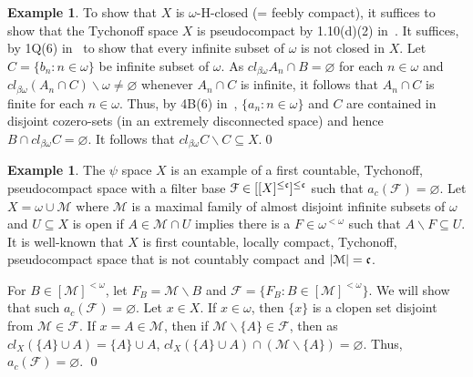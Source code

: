 \documentclass[11pt]{amsart}
\theoremstyle{definition}
\newtheorem{example}[theorem]{Example}
\theoremstyle{remark}
\numberwithin{equation}{section}
\begin{document}
\begin{example}
To show that $X$ is $\omega$-H-closed (= feebly compact), it suffices to show that the Tychonoff space $X$ is pseudocompact by 1.10(d)(2) in~\cite{PW}. It suffices, by 1Q(6) in~\cite{PW} to show that every infinite subset of $\omega$ is not closed in $X$.  Let $C = \{b_n:n \in \omega\}$ be infinite subset of $\omega$.  As $cl_{\beta\omega}A_n \cap B = \varnothing$ for each $n \in \omega$ and $cl_{\beta\omega}(A_n \cap C)\backslash \omega \ne \varnothing$ whenever $A_n \cap C$ is infinite, it follows that $A_n \cap C$ is finite for each $n \in \omega$.  Thus, by 4B(6) in~\cite{GJ}, $\{a_n:n \in \omega\}$ and $C$ are contained in disjoint cozero-sets (in an extremely disconnected space) and hence $B \cap cl_{\beta\omega}C = \varnothing$. It follows that $cl_{\beta\omega}C\backslash C \subseteq X$.\qed

\end{example}

\begin{example} 
The $\psi$ space $X$ is an example of a first countable, Tychonoff, pseudocompact space with a filter base ${{\ensuremath{\mathcal{F}}}} \in [[X]^{\leq \frak c}]^{\leq \frak c}$  such that $a_{c}({{\ensuremath{\mathcal{F}}}}) = \varnothing$.
Let $X = \omega \cup {{\ensuremath{\mathcal{M}}}}$ where ${{\ensuremath{\mathcal{M}}}}$ is a maximal family of almost disjoint infinite subsets of $\omega$ and $U \subseteq X$ is open if $A \in {{\ensuremath{\mathcal{M}}}} \cap U$ implies there is a $F \in \omega^{<\omega}$ such that $A\backslash F \subseteq U$. It is well-known that $X$ is first countable, locally compact, Tychonoff, pseudocompact space that is not countably compact and $|{{\ensuremath{\mathcal{M}}}}| = \frak c$.  

For $B \in [{{\ensuremath{\mathcal{M}}}}]^{<\omega}$, let $F_B = {{\ensuremath{\mathcal{M}}}}\backslash B$  and ${{\ensuremath{\mathcal{F}}}} = \{F_B: B \in [{\ensuremath{\mathcal{{M}}}}]^{<\omega}\}$.   We will show that  such $a_{c}({{\ensuremath{\mathcal{F}}}}) = \varnothing$.  Let $x \in X$.  If $x \in \omega$, then $\{x\}$ is a clopen set disjoint from  ${{\ensuremath{\mathcal{M}}}} \in {{\ensuremath{\mathcal{F}}}}$. If $x = A \in {{\ensuremath{\mathcal{M}}}}$, then if ${{\ensuremath{\mathcal{M}}}}\backslash \{A\} \in {{\ensuremath{\mathcal{F}}}}$, then as  $cl_X(\{A\} \cup A) = \{A\} \cup A $, $cl_X(\{A\} \cup A) \cap ({{\ensuremath{\mathcal{M}}}}\backslash \{A\}) = \varnothing$.
Thus, $a_{c}({{\ensuremath{\mathcal{F}}}}) = \varnothing$. \qed
\end{example}
\end{document}
